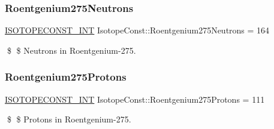 \subsubsection{\texorpdfstring{Roentgenium275\+Neutrons}{Roentgenium275Neutrons}}
{\footnotesize\ttfamily \mbox{\hyperlink{group___isotope_const-_macros_ga5f18360b3e99483a35c32d789e62621c}{I\+S\+O\+T\+O\+P\+E\+C\+O\+N\+S\+T\+\_\+\+I\+NT}} Isotope\+Const\+::\+Roentgenium275\+Neutrons = 164}

\$ \$ Neutrons in Roentgenium-\/275. \mbox{\label{group___isotope_const-_roentgenium-_rg275_ga04d3e79a8019b1bd6056e8a75924678b}} 
\subsubsection{\texorpdfstring{Roentgenium275\+Protons}{Roentgenium275Protons}}
{\footnotesize\ttfamily \mbox{\hyperlink{group___isotope_const-_macros_ga5f18360b3e99483a35c32d789e62621c}{I\+S\+O\+T\+O\+P\+E\+C\+O\+N\+S\+T\+\_\+\+I\+NT}} Isotope\+Const\+::\+Roentgenium275\+Protons = 111}

\$ \$ Protons in Roentgenium-\/275. 